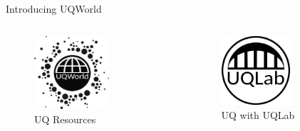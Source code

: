 \documentclass[]{rsuqbeamernew}
\begin{document}
\begin{frame}[t]{Introducing UQWorld}
\begin{columns}
\begin{columns}
      \begin{figure}
        \includegraphics[width=0.65\textwidth]{../figures/uq-resources_512}
        \caption*{UQ Resources}
      \end{figure}
      
      \begin{figure}
        \includegraphics[width=0.6\textwidth]{../figures/uq_with_uqlab_512}
        \caption*{UQ with UQLab}
      \end{figure}
    \end{columns}
  \end{columns}

\end{frame}

  
\end{document}
